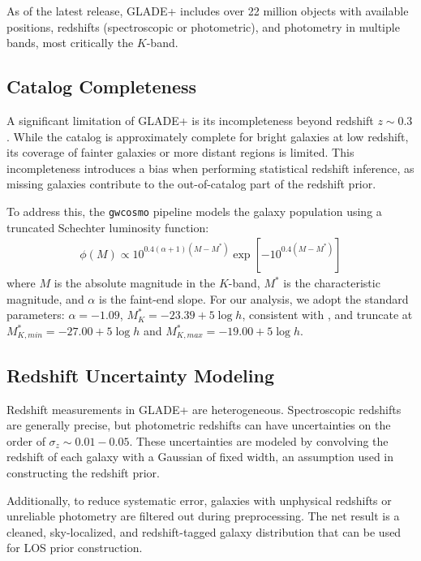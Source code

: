 As of the latest release, GLADE+ includes over 22 million objects with available positions, redshifts (spectroscopic or photometric), and photometry in multiple bands, most critically the $K$-band.

\subsection{Catalog Completeness}
\label{sec:luminosity_function}

A significant limitation of GLADE+ is its incompleteness beyond redshift $z \sim 0.3$. While the catalog is approximately complete for bright galaxies at low redshift, its coverage of fainter galaxies or more distant regions is limited. This incompleteness introduces a bias when performing statistical redshift inference, as missing galaxies contribute to the out-of-catalog part of the redshift prior.

To address this, the \texttt{gwcosmo} pipeline models the galaxy population using a truncated Schechter luminosity function:
\begin{align}
    \phi(M) \propto 10^{0.4(\alpha + 1)(M - M^*)} \exp[-10^{0.4(M - M^*)}]
\end{align}
where \( M \) is the absolute magnitude in the $K$-band, $M^*$ is the characteristic magnitude, and $\alpha$ is the faint-end slope. For our analysis, we adopt the standard parameters: $\alpha = -1.09$, $M^*_K = -23.39 + 5\log h$, consistent with \cite{kochanek2001k}, and truncate at $M^*_{K,min} = -27.00 + 5\log h$ and $M^*_{K,max} = -19.00 + 5\log h$.

\subsection{Redshift Uncertainty Modeling}

Redshift measurements in GLADE+ are heterogeneous. Spectroscopic redshifts are generally precise, but photometric redshifts can have uncertainties on the order of $\sigma_z \sim 0.01-0.05$. These uncertainties are modeled by convolving the redshift of each galaxy with a Gaussian of fixed width, an assumption used in constructing the redshift prior.

Additionally, to reduce systematic error, galaxies with unphysical redshifts or unreliable photometry are filtered out during preprocessing. The net result is a cleaned, sky-localized, and redshift-tagged galaxy distribution that can be used for \ac{LOS} prior construction.

